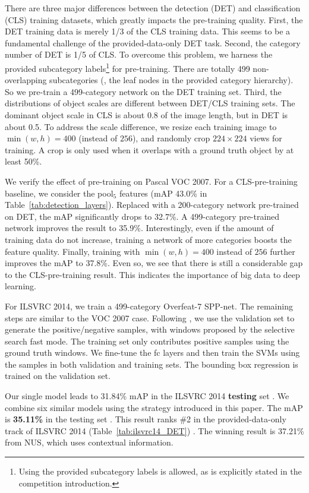 \documentclass[10pt,journal,cspaper,compsoc]{IEEEtran}
\begin{document}
There are three major differences between the detection (DET) and classification (CLS) training datasets, which greatly impacts the pre-training quality. First, the DET training data is merely 1/3 of the CLS training data. This seems to be a fundamental challenge of the provided-data-only DET task. Second, the category number of DET is 1/5 of CLS. To overcome this problem, we harness the provided subcategory labels\footnote{Using the provided subcategory labels is allowed, as is explicitly stated in the competition introduction.} for pre-training. There are totally 499 non-overlapping subcategories (\ie, the leaf nodes in the provided category hierarchy). So we pre-train a 499-category network on the DET training set. Third, the distributions of object scales are different between DET/CLS training sets. The dominant object scale in CLS is about 0.8 of the image length, but in DET is about 0.5. To address the scale difference, we resize each training image to $\min(w,h)=400$ (instead of $256$), and randomly crop $224\times224$ views for training. A crop is only used when it overlaps with a ground truth object by at least 50\%.

We verify the effect of pre-training on Pascal VOC 2007. For a CLS-pre-training baseline, we consider the pool$_5$ features (mAP 43.0\% in Table~\ref{tab:detection_layers}). Replaced with a 200-category network pre-trained on DET, the mAP significantly drops to 32.7\%. A 499-category pre-trained network improves the result to 35.9\%. Interestingly, even if the amount of training data do not increase, training a network of more categories boosts the feature quality. Finally, training with $\min(w,h)=400$ instead of $256$ further improves the mAP to 37.8\%. Even so, we see that there is still a considerable gap to the CLS-pre-training result. This indicates the importance of big data to deep learning.

For ILSVRC 2014, we train a 499-category Overfeat-7 SPP-net. The remaining steps are similar to the VOC 2007 case. Following \cite{Girshick2014}, we use the validation set to generate the positive/negative samples, with windows proposed by the selective search fast mode. The training set only contributes positive samples using the ground truth windows. We fine-tune the fc layers and then train the SVMs using the samples in both validation and training sets. The bounding box regression is trained on the validation set.

Our single model leads to 31.84\% mAP in the ILSVRC 2014 \textbf{testing} set \cite{Russakovsky2014}. We combine six similar models using the strategy introduced in this paper. The mAP is \textbf{35.11\%} in the testing set \cite{Russakovsky2014}. This result ranks \#2 in the provided-data-only track of ILSVRC 2014 (Table~\ref{tab:ilsvrc14_DET}) \cite{Russakovsky2014}. The winning result is 37.21\% from NUS, which uses contextual information.
\end{document}
